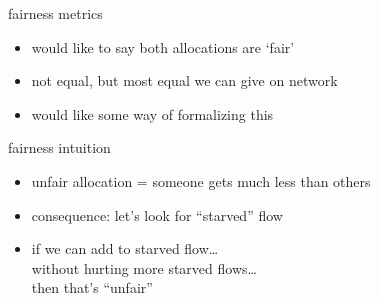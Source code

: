 \begin{frame}{fairness metrics}
    \begin{itemize}
    \item would like to say both allocations are `fair'
    \item not equal, but most equal we can give on network
    \vspace{.5cm}
    \item would like some way of formalizing this
    \end{itemize}
\end{frame}

\begin{frame}{fairness intuition}
    \begin{itemize}
    \item unfair allocation = someone gets much less than others
    \vspace{.5cm}
    \item consequence: let's look for ``starved'' flow
    \item if we can add to starved flow\ldots \\
          without hurting more starved flows\ldots \\
          then that's ``unfair''
    \end{itemize}
\end{frame}

